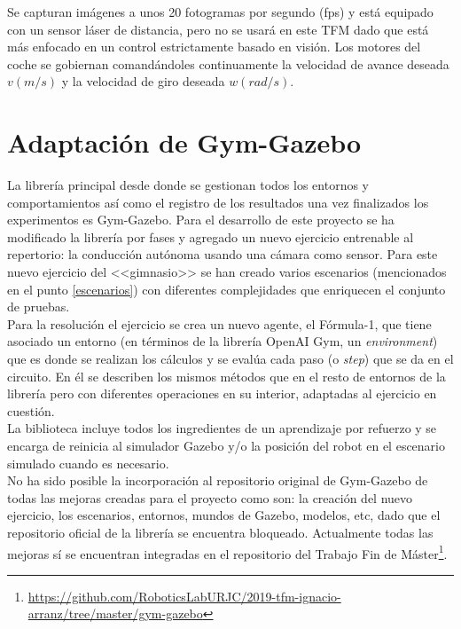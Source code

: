Se capturan imágenes a unos 20 fotogramas por segundo (fps) y está equipado con un sensor láser de distancia, pero no se usará en este TFM dado que está más enfocado en un control estrictamente basado en visión. Los motores del coche se gobiernan comandándoles continuamente la velocidad de avance deseada $v (m/s)$ y la velocidad de giro deseada $w (rad/s)$.

\section{Adaptación de Gym-Gazebo}\label{adaptacion-gym-gazebo}

La librería principal desde donde se gestionan todos los entornos y comportamientos así como el registro de los resultados una vez finalizados los experimentos es Gym-Gazebo. Para el desarrollo de este proyecto se ha modificado la librería por fases y agregado un nuevo ejercicio entrenable al repertorio: la conducción autónoma usando una cámara como sensor. Para este nuevo ejercicio del <<gimnasio>> se han creado varios escenarios (mencionados en el punto \ref{escenarios}) con diferentes complejidades que enriquecen el conjunto de pruebas.\\

Para la resolución el ejercicio se crea un nuevo agente, el Fórmula-1, que tiene asociado un entorno (en términos de la librería OpenAI Gym, un \textit{environment}) que es donde se realizan los cálculos y se evalúa cada paso (o \textit{step}) que se da en el circuito. En él se describen los mismos métodos que en el resto de entornos de la librería pero con diferentes operaciones en su interior, adaptadas al ejercicio en cuestión.\\

La biblioteca incluye todos los ingredientes de un aprendizaje por refuerzo y se encarga de reinicia al simulador Gazebo y/o la posición del robot en el escenario simulado cuando es necesario.\\

No ha sido posible la incorporación al repositorio original de Gym-Gazebo de todas las mejoras creadas para el proyecto como son: la creación del nuevo ejercicio, los escenarios, entornos, mundos de Gazebo, modelos, etc, dado que el repositorio oficial de la librería se encuentra bloqueado. Actualmente todas las mejoras sí se encuentran integradas en el repositorio del Trabajo Fin de Máster\footnote{\url{https://github.com/RoboticsLabURJC/2019-tfm-ignacio-arranz/tree/master/gym-gazebo}}.

